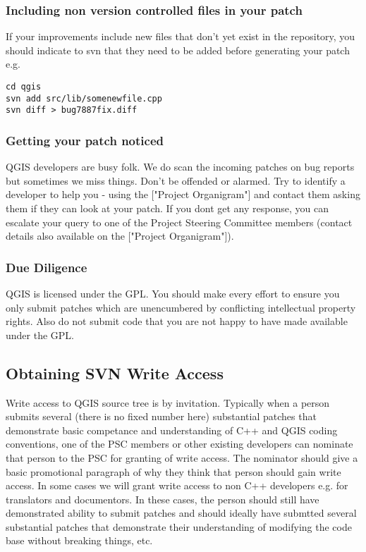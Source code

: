 \subsubsection{Including non version controlled files in your patch}
If your improvements include new files that don't yet exist in the repository, you should indicate 
to svn that they need to be added before generating your patch e.g.

\begin{verbatim}
cd qgis
svn add src/lib/somenewfile.cpp
svn diff > bug7887fix.diff
\end{verbatim}

\subsubsection{Getting your patch noticed}
QGIS developers are busy folk. We do scan the incoming patches on bug reports but sometimes we miss things. 
Don't be offended or alarmed. Try to identify a developer to help you - using the ["Project Organigram"] and 
contact them asking them if they can look at your patch. If you dont get any response, you can escalate your 
query to one of the Project Steering Committee members (contact details also available on the ["Project Organigram"]).

\subsubsection{Due Diligence}
QGIS is licensed under the GPL. You should make every effort to ensure you only submit patches which are 
unencumbered by conflicting intellectual property rights. Also do not submit code that you are not happy to 
have made available under the GPL.

\subsection{Obtaining SVN Write Access}
Write access to QGIS source tree is by invitation. Typically when a person submits several (there is no fixed 
number here) substantial patches that demonstrate basic competance and understanding of C++ and QGIS coding 
conventions, one of the PSC members or other existing developers can nominate that person to the PSC for granting 
of write access. The nominator should give a basic promotional paragraph of why they think that person should gain 
write access. In some cases we will grant write access to non C++ developers e.g. for translators and documentors. 
In these cases, the person should still have demonstrated ability to submit patches and should ideally have submtted 
several substantial patches that demonstrate their understanding of modifying the code base without breaking things, etc.

